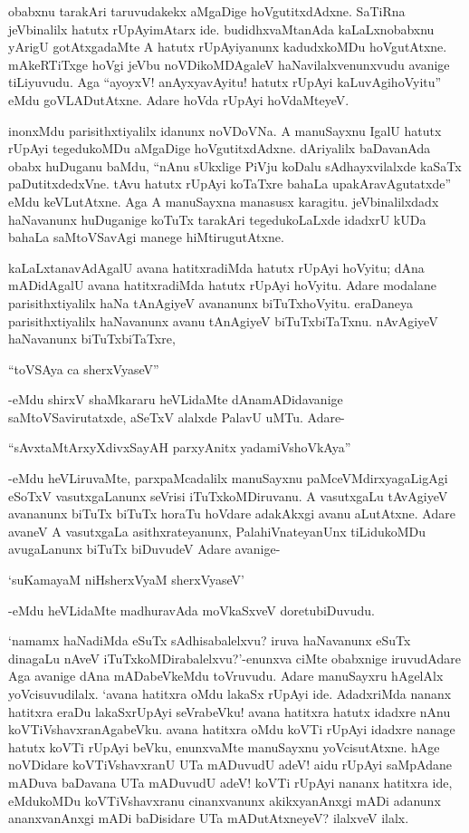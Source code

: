 obabxnu tarakAri taruvudakekx aMgaDige hoVgutitxdAdxne. SaTiRna jeVbinalilx hatutx rUpAyimAtarx ide. budidhxvaMtanAda kaLaLxnobabxnu yArigU gotAtxgadaMte A hatutx rUpAyiyanunx kadudxkoMDu hoVgutAtxne. mAkeRTiTxge hoVgi jeVbu noVDikoMDAgaleV haNavilalxvenunxvudu avanige tiLiyuvudu. Aga ``ayoyxV! anAyxyavAyitu! hatutx rUpAyi kaLuvAgihoVyitu'' eMdu goVLADutAtxne. Adare hoVda rUpAyi hoVdaMteyeV.

inonxMdu parisithxtiyalilx idanunx noVDoVNa. A manuSayxnu IgalU hatutx rUpAyi tegedukoMDu aMgaDige hoVgutitxdAdxne. dAriyalilx baDavanAda obabx huDuganu baMdu, ``nAnu sUkxlige PiVju koDalu sAdhayxvilalxde kaSaTx paDutitxdedxVne. tAvu hatutx rUpAyi koTaTxre bahaLa upakAravAgutatxde'' eMdu keVLutAtxne. Aga A manuSayxna manasusx karagitu. jeVbinalilxdadx haNavanunx huDuganige koTuTx tarakAri tegedukoLaLxde idadxrU kUDa bahaLa saMtoVSavAgi manege hiMtirugutAtxne.

kaLaLxtanavAdAgalU avana hatitxradiMda hatutx rUpAyi hoVyitu; dAna mADidAgalU avana hatitxradiMda hatutx rUpAyi hoVyitu. Adare modalane parisithxtiyalilx haNa tAnAgiyeV avananunx biTuTxhoVyitu. eraDaneya parisithxtiyalilx haNavanunx avanu tAnAgiyeV biTuTxbiTaTxnu. nAvAgiyeV haNavanunx biTuTxbiTaTxre,

\begin{shloka}
``toVSAya ca sherxVyaseV''
\end{shloka}

-eMdu shirxV shaMkararu heVLidaMte dAnamADidavanige saMtoVSavirutatxde, aSeTxV alalxde PalavU uMTu. Adare-

\begin{shloka}
``sAvxtaMtArxyXdivxSayAH parxyAnitx yadamiVshoVkAya''
\end{shloka}

-eMdu heVLiruvaMte, parxpaMcadalilx manuSayxnu paMceVMdirxyagaLigAgi eSoTxV vasutxgaLanunx seVrisi iTuTxkoMDiruvanu. A vasutxgaLu tAvAgiyeV avananunx biTuTx biTuTx horaTu hoVdare adakAkxgi avanu aLutAtxne. Adare avaneV A vasutxgaLa asithxrateyanunx, PalahiVnateyanUnx tiLidukoMDu avugaLanunx biTuTx biDuvudeV Adare avanige-

\begin{shloka}
`suKamayaM niHsherxVyaM sherxVyaseV'
\end{shloka}

-eMdu heVLidaMte madhuravAda moVkaSxveV doretubiDuvudu.

`namamx haNadiMda eSuTx sAdhisabalelxvu? iruva haNavanunx eSuTx dinagaLu nAveV iTuTxkoMDirabalelxvu?'-enunxva ciMte obabxnige iruvudAdare Aga avanige dAna mADabeVkeMdu toVruvudu. Adare manuSayxru hAgelAlx yoVcisuvudilalx. `avana hatitxra oMdu lakaSx rUpAyi ide. AdadxriMda nananx hatitxra eraDu lakaSxrUpAyi seVrabeVku! avana hatitxra hatutx idadxre nAnu koVTiVshavxranAgabeVku. avana hatitxra oMdu koVTi rUpAyi idadxre nanage hatutx koVTi rUpAyi beVku, enunxvaMte manuSayxnu yoVcisutAtxne. hAge noVDidare koVTiVshavxranU UTa mADuvudU adeV! aidu rUpAyi saMpAdane mADuva baDavana UTa mADuvudU adeV! koVTi rUpAyi nananx hatitxra ide, eMdukoMDu koVTiVshavxranu cinanxvanunx akikxyanAnxgi mADi adanunx ananxvanAnxgi mADi baDisidare UTa mADutAtxneyeV? ilalxveV ilalx.


